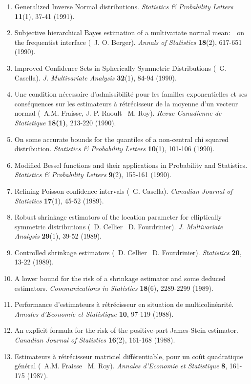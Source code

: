 \begin{enumerate}
\item Generalized Inverse Normal distributions.
{\it Statistics \& Probability Letters} {\bf 11}(1), 37-41 (1991).

\item Subjective hierarchical Bayes estimation of a
multivariate normal mean:\ \ on the frequentist interface (\avec\ 
J. O. Berger). {\it Annals of Statistics\/} {\bf 18}(2), 617-651 (1990).

\item Improved Confidence Sets in Spherically Symmetric
Distributions (\avec\  G. Casella). {\it J. Multivariate
Analysis\/} {\bf 32}(1), 84-94 (1990). 

\item Une condition n\'ecessaire d'admissibilit\'e pour les
familles exponentielles et ses cons\'equences sur les estimateurs \`a 
r\'etr\'ecisseur de la moyenne d'un vecteur normal (\avec\ 
A.M. Fraisse, J. P. Raoult \et\  M. Roy).
{\it Revue Canadienne de Statistique\/} {\bf 18(1)}, 213-220 (1990).  

\item On some accurate bounds for the quantiles of a
non-central chi squared distribution.
{\it Statistics \& Probability Letters} {\bf 10}(1), 101-106 (1990).

\item Modified Bessel functions and their applications in Probability and Statistics.
{\it Statistics \& Probability Letters} {\bf 9}(2), 155-161 (1990).%

\item Refining Poisson confidence intervals (\avec\  G. Casella).
{\it Canadian Journal of Statistics\/} {\bf 17}(1), 45-52 (1989).

\item Robust shrinkage estimators of the location parameter
for elliptically symmetric distributions (\avec\  D. Cellier \et\  D.
Fourdrinier). {\it J. Multivariate Analysis\/} {\bf 29}(1), 39-52 (1989).

\item Controlled shrinkage estimators (\avec\  D. Cellier \et\  
D. Fourdrinier). {\it Statistics\/} {\bf 20}, 13-22 (1989).

\item A lower bound for the risk of a shrinkage estimator and
some deduced estimators. {\it Communications in
Statistics\/} {\bf 18}(6), 2289-2299 (1989).

\item Performance d'estimateurs \`a r\'etr\'ecisseur en
situation de multicolin\'earit\'e. {\it Annales d'Economie et Statistique\/} 
{\bf 10}, 97-119 (1988).

\item An explicit formula for the risk of the positive-part
James-Stein estimator. {\it Canadian Journal of Statistics\/}
{\bf 16}(2), 161-168 (1988).

\item Estimateurs \`a r\'etr\'ecisseur matriciel
diff\'erentiable, pour un co\^ut quadratique g\'en\'eral (\avec\ 
A.M. Fraisse \et\  M. Roy). {\it Annales d'Economie et 
Statistique\/} {\bf 8}, 161-175 (1987).
\end{enumerate}

